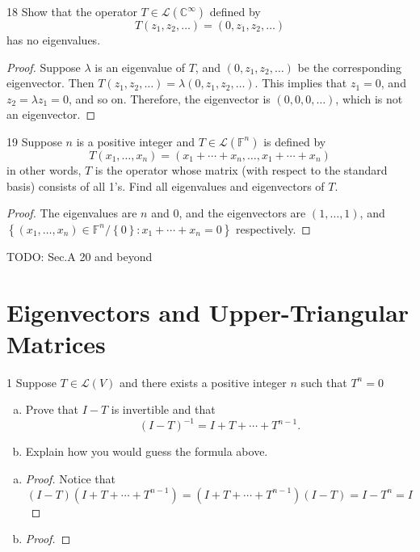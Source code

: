 \documentclass{article}
\newenvironment{problem}[1]{\begin{prob*}{#1}{}}{\end{prob*}}
\begin{document}
\begin{problem}{18}
Show that the operator $T \in \mathcal{L}(\mathbb{C}^\infty)$ defined by \[
	T(z_1,z_2, \ldots ) = (0, z_1, z_2, \ldots )\]
has no eigenvalues.
\end{problem}
\begin{proof}
	Suppose $\lambda$ is an eigenvalue of $T$, and $(0, z_1, z_2, \ldots )$ be the corresponding eigenvector. Then $T(z_1,z_2, \ldots ) = \lambda (0, z_1, z_2, \ldots )$. This implies that $z_1 = 0$, and $z_2 = \lambda z_1 = 0$, and so on. Therefore, the eigenvector is $(0,0,0, \ldots )$, which is not an eigenvector.
\end{proof}

\begin{problem}{19}
Suppose $n$ is a positive integer and $T \in \mathcal{L}(\mathbb{F}^n)$ is defined by \[
	T(x_1, \ldots ,x_n) = (x_1 + \cdots + x_n, \ldots , x_1 + \cdots + x_n)\]
in other words, $T$ is the operator whose matrix (with respect to the standard basis) consists of all 1's. Find all eigenvalues and eigenvectors of $T$.
\end{problem}
\begin{proof}
	The eigenvalues are $n$ and $0$, and the eigenvectors are $(1, \ldots ,1)$, and $\left\{(x_1, \ldots ,x_n) \in \mathbb{F}^n / \left\{0\right\} : x_1 + \cdots +x_n = 0 \right\} $ respectively.
\end{proof}

TODO: Sec.A 20 and beyond

\section{Eigenvectors and Upper-Triangular Matrices}

\begin{problem}{1}
Suppose $T \in \mathcal{L}(V)$ and there exists a positive integer $n$ such that $T^{n} = 0$
\begin{enumerate}[(a)]
	\item Prove that $I - T$ is invertible and that \[
		      (I - T)^{-1} = I + T + \cdots + T^{n-1}.\]
	\item Explain how you would guess the formula above.
\end{enumerate}
\end{problem}
\begin{enumerate}[(a)]
	\item \begin{proof}
		      Notice that \[
			      (I - T)(I + T + \cdots + T^{n - 1}) = (I + T + \cdots + T^{n - 1})(I - T) = I - T^n = I\]
	      \end{proof}
	\item \begin{proof}
	      \end{proof}
\end{enumerate}
\end{document}
